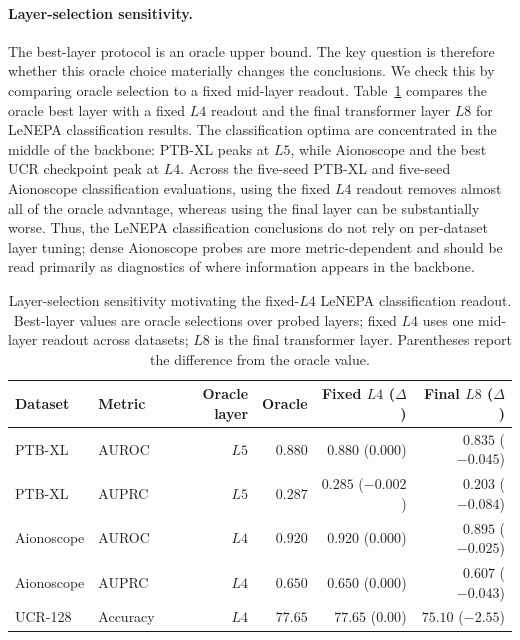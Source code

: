 \documentclass[sigconf,anonymous,review]{acmart}
\begin{document}
\paragraph{Layer-selection sensitivity.}
The best-layer protocol is an oracle upper bound.
The key question is therefore whether this oracle choice materially changes the conclusions.
We check this by comparing oracle selection to a fixed mid-layer readout.
Table~\ref{tab:layer_selection_sensitivity} compares the oracle best layer with a fixed $L4$ readout and the final transformer layer $L8$ for LeNEPA classification results.
The classification optima are concentrated in the middle of the backbone: PTB-XL peaks at $L5$, while Aionoscope and the best UCR checkpoint peak at $L4$.
Across the five-seed PTB-XL and five-seed Aionoscope classification evaluations, using the fixed $L4$ readout removes almost all of the oracle advantage, whereas using the final layer can be substantially worse.
Thus, the LeNEPA classification conclusions do not rely on per-dataset layer tuning; dense Aionoscope probes are more metric-dependent and should be read primarily as diagnostics of where information appears in the backbone.

\begin{table}[t]
\centering
\scriptsize
\caption{Layer-selection sensitivity motivating the fixed-$L4$ LeNEPA classification readout. Best-layer values are oracle selections over probed layers; fixed $L4$ uses one mid-layer readout across datasets; $L8$ is the final transformer layer. Parentheses report the difference from the oracle value.}
\label{tab:layer_selection_sensitivity}
\begin{tabular}{llrrrr}
\toprule
Dataset & Metric & Oracle layer & Oracle & Fixed $L4$ ($\Delta$) & Final $L8$ ($\Delta$) \\
\midrule
PTB-XL & AUROC & $L5$ & $0.880$ & $0.880$ ($0.000$) & $0.835$ ($-0.045$) \\
PTB-XL & AUPRC & $L5$ & $0.287$ & $0.285$ ($-0.002$) & $0.203$ ($-0.084$) \\
Aionoscope & AUROC & $L4$ & $0.920$ & $0.920$ ($0.000$) & $0.895$ ($-0.025$) \\
Aionoscope & AUPRC & $L4$ & $0.650$ & $0.650$ ($0.000$) & $0.607$ ($-0.043$) \\
UCR-128 & Accuracy & $L4$ & $77.65$ & $77.65$ ($0.00$) & $75.10$ ($-2.55$) \\
\bottomrule
\end{tabular}
\end{table}
\end{document}
